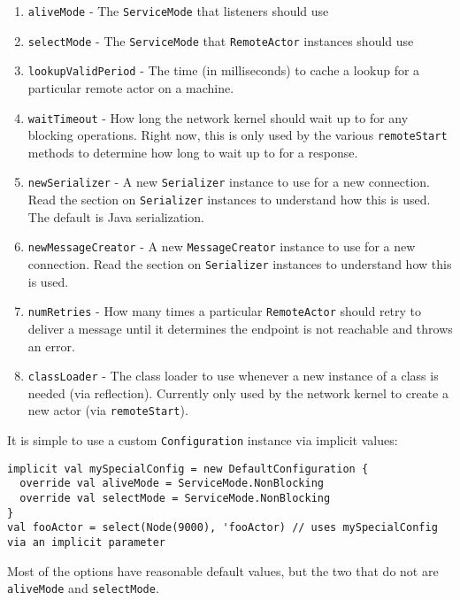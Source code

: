 \documentclass{article}
\begin{document}
\begin{enumerate}
  \item \verb|aliveMode| - The \verb|ServiceMode| that listeners should use
  \item \verb|selectMode| - The \verb|ServiceMode| that \verb|RemoteActor| instances should use
  \item \verb|lookupValidPeriod| - The time (in milliseconds) to cache a lookup for a particular 
    remote actor on a machine.
  \item \verb|waitTimeout| - How long the network kernel should wait up to for any blocking operations.
    Right now, this is only used by the various \verb|remoteStart| methods to determine how long
    to wait up to for a response.
  \item \verb|newSerializer| - A new \verb|Serializer| instance to use for a new connection. 
    Read the section on \verb|Serializer| instances to understand how this is used. The
    default is Java serialization.
  \item \verb|newMessageCreator| - A new \verb|MessageCreator| instance to use for a new connection.
    Read the section on \verb|Serializer| instances to understand how this is used.
  \item \verb|numRetries| - How many times a particular \verb|RemoteActor| should retry to deliver a message
    until it determines the endpoint is not reachable and throws an error.
  \item \verb|classLoader| - The class loader to use whenever a new instance of a class is needed (via reflection). 
    Currently only used by the network kernel to create a new actor (via \verb|remoteStart|).
\end{enumerate}
It is simple to use a custom \verb|Configuration| instance via implicit values:
\begin{verbatim}
implicit val mySpecialConfig = new DefaultConfiguration {
  override val aliveMode = ServiceMode.NonBlocking
  override val selectMode = ServiceMode.NonBlocking 
}
val fooActor = select(Node(9000), 'fooActor) // uses mySpecialConfig via an implicit parameter
\end{verbatim}
Most of the options have reasonable default values, but the two that do not are \verb|aliveMode| and
\verb|selectMode|. 
\end{document}
